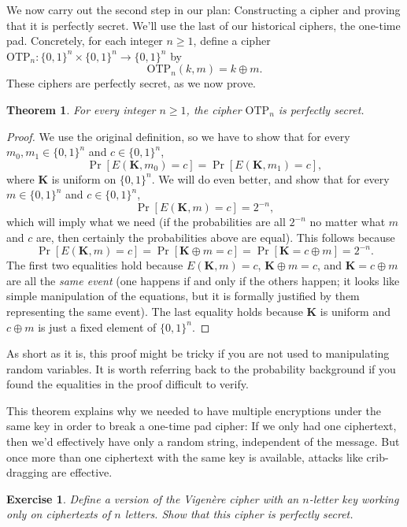 \documentclass[11pt]{article}
\newtheorem{exercise}{Exercise}
\newtheorem{theorem}{Theorem}
\newcommand{\enc}{E}
\newcommand{\bits}{\{0,1\}}
\newcommand{\bK}{\mathbf{K}}
\newcommand{\otp}{\mathrm{OTP}}
\begin{document}
We now carry out the second step in our plan: Constructing a cipher and proving
that it is perfectly secret. We'll use the last of our historical ciphers, the
one-time pad.  Concretely, for each integer $n\geq 1$, define a cipher
$\otp_n : \bits^n\times\bits^n \to \bits^n$ by
\[
    \otp_n(k,m) = k \oplus m.
\]
These ciphers are perfectly secret, as we now prove.
\begin{theorem}
    For every integer $n\geq 1$, the cipher $\otp_n$ is perfectly secret.
\end{theorem}
\begin{proof} We use the original definition, so we have to show that for every
    $m_0,m_1\in\bits^n$ and $c\in\bits^n$,
    \[
        \Pr[\enc(\bK,m_0) = c] = \Pr[\enc(\bK,m_1) = c],
    \]
    where $\bK$ is uniform on $\bits^n$.  We will do even better, and show that
    for every $m\in\bits^n$ and $c\in\bits^n$,
    \[
        \Pr[\enc(\bK,m) = c] = 2^{-n}, 
    \]
        which will imply what we need (if the probabilities are all $2^{-n}$ no
        matter what $m$ and $c$ are, then certainly the probabilities above are
        equal). This follows because
    \[
        \Pr[\enc(\bK,m) = c] = \Pr[\bK\oplus m=c] = \Pr[\bK=c\oplus m] = 2^{-n}.
    \]
    The first two equalities hold because $\enc(\bK,m)=c$, $\bK\oplus m = c$,
    and $\bK=c\oplus m$ are all the \emph{same event} (one happens if and only
    if the others happen; it looks like simple manipulation of the equations,
    but it is formally justified by them representing the same event). The last
    equality holds because $\bK$ is uniform and $c\oplus m$ is just a fixed
    element of $\bits^n$.
\end{proof}
As short as it is, this proof might be tricky if you are not used to
manipulating random variables. It is worth referring back to the probability
background if you found the equalities in the proof difficult to verify.

This theorem explains why we needed to have multiple encryptions under the same
key in order to break a one-time pad cipher: If we only had one ciphertext,
then we'd effectively have only a random string, independent of the message.
But once more than one ciphertext with the same key is available, attacks like
crib-dragging are effective.

\begin{exercise}
    Define a version of the Vigen\`{e}re cipher with an $n$-letter
    key working only on ciphertexts of $n$ letters. Show that this
    cipher is perfectly secret.
\end{exercise}
\end{document}
